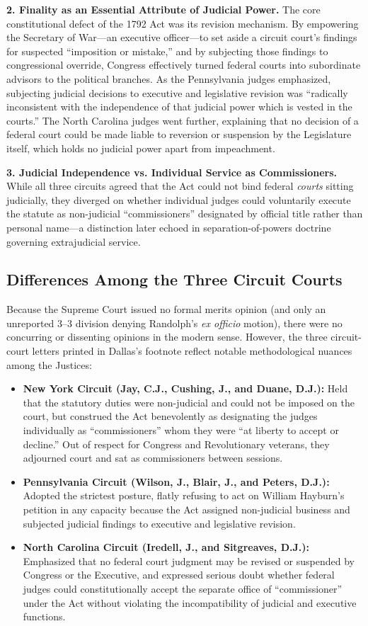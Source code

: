 \documentclass[12pt]{article}
\begin{document}
\textbf{2. Finality as an Essential Attribute of Judicial Power.} The core constitutional defect of the 1792 Act was its revision mechanism. By empowering the Secretary of War---an executive officer---to set aside a circuit court's findings for suspected ``imposition or mistake,'' and by subjecting those findings to congressional override, Congress effectively turned federal courts into subordinate advisors to the political branches. As the Pennsylvania judges emphasized, subjecting judicial decisions to executive and legislative revision was ``radically inconsistent with the independence of that judicial power which is vested in the courts.'' The North Carolina judges went further, explaining that no decision of a federal court could be made liable to reversion or suspension by the Legislature itself, which holds no judicial power apart from impeachment.

\textbf{3. Judicial Independence vs. Individual Service as Commissioners.} While all three circuits agreed that the Act could not bind federal \textit{courts} sitting judicially, they diverged on whether individual judges could voluntarily execute the statute as non-judicial ``commissioners'' designated by official title rather than personal name---a distinction later echoed in separation-of-powers doctrine governing extrajudicial service.

\subsection{Differences Among the Three Circuit Courts}

Because the Supreme Court issued no formal merits opinion (and only an unreported 3--3 division denying Randolph's \textit{ex officio} motion), there were no concurring or dissenting opinions in the modern sense. However, the three circuit-court letters printed in Dallas's footnote reflect notable methodological nuances among the Justices:
\begin{itemize}
  \item \textbf{New York Circuit (Jay, C.J., Cushing, J., and Duane, D.J.):} Held that the statutory duties were non-judicial and could not be imposed on the court, but construed the Act benevolently as designating the judges individually as ``commissioners'' whom they were ``at liberty to accept or decline.'' Out of respect for Congress and Revolutionary veterans, they adjourned court and sat as commissioners between sessions.
  \item \textbf{Pennsylvania Circuit (Wilson, J., Blair, J., and Peters, D.J.):} Adopted the strictest posture, flatly refusing to act on William Hayburn's petition in any capacity because the Act assigned non-judicial business and subjected judicial findings to executive and legislative revision.
  \item \textbf{North Carolina Circuit (Iredell, J., and Sitgreaves, D.J.):} Emphasized that no federal court judgment may be revised or suspended by Congress or the Executive, and expressed serious doubt whether federal judges could constitutionally accept the separate office of ``commissioner'' under the Act without violating the incompatibility of judicial and executive functions.
\end{itemize}
\end{document}
